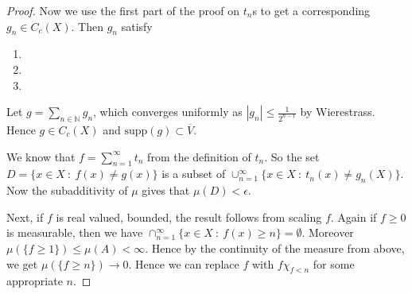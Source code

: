 \begin{proof}
  Now we use the first part of the proof on $t_n$s to get a
  corresponding $g_n \in C_c(X)$. Then $g_n$ satisfy
  \begin{enumerate}[label=(\arabic*)]
    \item
    \item
    \item
  \end{enumerate}
  Let $g = \sum_{n \in \mathbb{N}} g_n$, which converges uniformly as
  $|g_n| \le \frac{1}{2^{n-1}}$ by Wierestrass. Hence $g \in C_c(X)$
  and $  \textrm{supp}(g) \subset \overline{V}$.

  We know that $f = \sum_{n = 1}^{\infty}  t_n$  from
  the definition of $t_n$. So the set $D = \{ x \in X  \ : \  f(x)
  \neq g(x) \}$ is a subset of $\cup_{n = 1}^{\infty} \{ x \in X  \ :
  \ t_n(x) \neq g_n(X)  \}$. Now the subadditivity of $\mu$ gives
  that $\mu(D) < \epsilon$.

  Next, if $f$ is real valued, bounded, the result follows from
  scaling $f$. Again if $f \ge 0$ is measurable, then we have
  $\cap_{n = 1}^{\infty} \{ x \in X  \ : \  f(x) \ge n \} =
  \emptyset$. Moreover $\mu(\{ f \ge 1 \}) \le \mu(A) < \infty$.
  Hence by the continuity of the measure from above, we get $\mu(\{ f
  \ge n \}) \to 0$. Hence we can replace $f$ with $f \chi_{f< n}$ for
  some appropriate $n$.
\end{proof}


